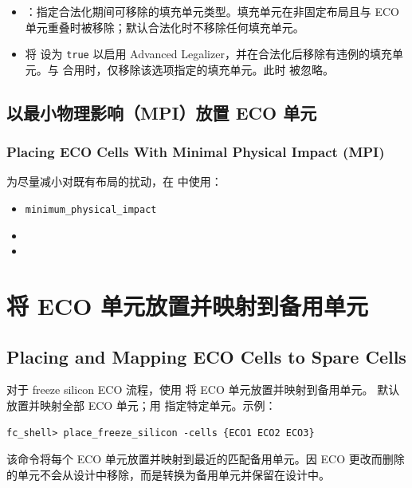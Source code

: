\begin{itemize}
  \item {}：指定合法化期间可移除的填充单元类型。填充单元在非固定布局且与 ECO 单元重叠时被移除；默认合法化时不移除任何填充单元。
  \item 将  设为 \texttt{true} 以启用 Advanced Legalizer，并在合法化后移除有违例的填充单元。与  合用时，仅移除该选项指定的填充单元。此时  被忽略。
\end{itemize}

\subsection{以最小物理影响（MPI）放置 ECO 单元}
\subsubsection*{Placing ECO Cells With Minimal Physical Impact (MPI)}

为尽量减小对既有布局的扰动，在  中使用：
\begin{itemize}
  \item {} \texttt{minimum\_physical\_impact}
  \item {}
  \item {}
\end{itemize}

\section{将 ECO 单元放置并映射到备用单元}
\subsection*{Placing and Mapping ECO Cells to Spare Cells}

对于 freeze silicon ECO 流程，使用  将 ECO 单元放置并映射到备用单元。
默认放置并映射全部 ECO 单元；用  指定特定单元。示例：
\begin{lstlisting}
fc_shell> place_freeze_silicon -cells {ECO1 ECO2 ECO3}
\end{lstlisting}

该命令将每个 ECO 单元放置并映射到最近的匹配备用单元。因 ECO 更改而删除的单元不会从设计中移除，而是转换为备用单元并保留在设计中。

